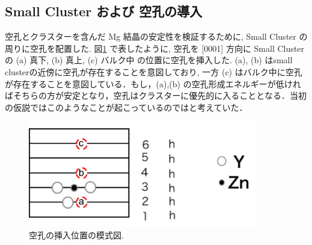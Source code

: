 \subsection{ Small Cluster および 空孔の導入}
空孔とクラスターを含んだ Mg 結晶の安定性を検証するために, Small Cluster の周りに空孔を配置した. 図\ref{fig2.4} で表したように, 空孔を [0001] 方向に Small Cluster の (a) 真下, (b) 真上, (c) バルク中 の位置に空孔を挿入した. (a), (b) はsmall clusterの近傍に空孔が存在することを意図しており, 一方 (c) はバルク中に空孔が存在することを意図している．もし，(a),(b) の空孔形成エネルギーが低ければそちらの方が安定となり，空孔はクラスターに優先的に入ることとなる．当初の仮説ではこのようなことが起こっているのではと考えていた．

\begin{figure}[htbp]
	\begin{center}
		\includegraphics[width=100mm]{../method/vacancyposition.png}
		\caption{空孔の挿入位置の模式図.}
		\label{fig2.4}
	\end{center}
\end{figure}



